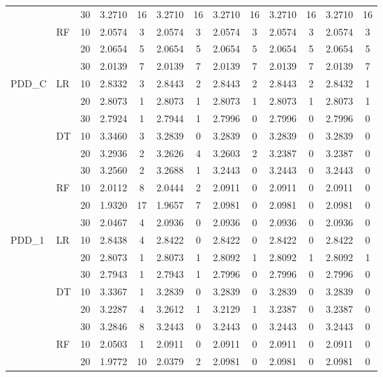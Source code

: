 \begin{table}[h]
\begin{tabular}{ll lcccccccccc}
     &  & 30 & 3.2710 & 16 & 3.2710 & 16 & 3.2710 & 16 & 3.2710 & 16 & 3.2710 & 16 \\
     & RF & 10 & 2.0574 & 3 & 2.0574 & 3 & 2.0574 & 3 & 2.0574 & 3 & 2.0574 & 3 \\
     &  & 20 & 2.0654 & 5 & 2.0654 & 5 & 2.0654 & 5 & 2.0654 & 5 & 2.0654 & 5 \\
     &  & 30 & 2.0139 & 7 & 2.0139 & 7 & 2.0139 & 7 & 2.0139 & 7 & 2.0139 & 7 \\
    \midrule
    PDD\_C & LR & 10 & 2.8332 & 3 & 2.8443 & 2 & 2.8443 & 2 & 2.8443 & 2 & 2.8432 & 1 \\
     &  & 20 & 2.8073 & 1 & 2.8073 & 1 & 2.8073 & 1 & 2.8073 & 1 & 2.8073 & 1 \\
     &  & 30 & 2.7924 & 1 & 2.7944 & 1 & 2.7996 & 0 & 2.7996 & 0 & 2.7996 & 0 \\
     & DT & 10 & 3.3460 & 3 & 3.2839 & 0 & 3.2839 & 0 & 3.2839 & 0 & 3.2839 & 0 \\
     &  & 20 & 3.2936 & 2 & 3.2626 & 4 & 3.2603 & 2 & 3.2387 & 0 & 3.2387 & 0 \\
     &  & 30 & 3.2560 & 2 & 3.2688 & 1 & 3.2443 & 0 & 3.2443 & 0 & 3.2443 & 0 \\
     & RF & 10 & 2.0112 & 8 & 2.0444 & 2 & 2.0911 & 0 & 2.0911 & 0 & 2.0911 & 0 \\
     &  & 20 & 1.9320 & 17 & 1.9657 & 7 & 2.0981 & 0 & 2.0981 & 0 & 2.0981 & 0 \\
     &  & 30 & 2.0467 & 4 & 2.0936 & 0 & 2.0936 & 0 & 2.0936 & 0 & 2.0936 & 0 \\
    \midrule
    PDD\_1 & LR & 10 & 2.8438 & 4 & 2.8422 & 0 & 2.8422 & 0 & 2.8422 & 0 & 2.8422 & 0 \\
     &  & 20 & 2.8073 & 1 & 2.8073 & 1 & 2.8092 & 1 & 2.8092 & 1 & 2.8092 & 1 \\
     &  & 30 & 2.7943 & 1 & 2.7943 & 1 & 2.7996 & 0 & 2.7996 & 0 & 2.7996 & 0 \\
     & DT & 10 & 3.3367 & 1 & 3.2839 & 0 & 3.2839 & 0 & 3.2839 & 0 & 3.2839 & 0 \\
     &  & 20 & 3.2287 & 4 & 3.2612 & 1 & 3.2129 & 1 & 3.2387 & 0 & 3.2387 & 0 \\
     &  & 30 & 3.2846 & 8 & 3.2443 & 0 & 3.2443 & 0 & 3.2443 & 0 & 3.2443 & 0 \\
     & RF & 10 & 2.0503 & 1 & 2.0911 & 0 & 2.0911 & 0 & 2.0911 & 0 & 2.0911 & 0 \\
     &  & 20 & 1.9772 & 10 & 2.0379 & 2 & 2.0981 & 0 & 2.0981 & 0 & 2.0981 & 0 \\

\end{tabular}
\end{table}
